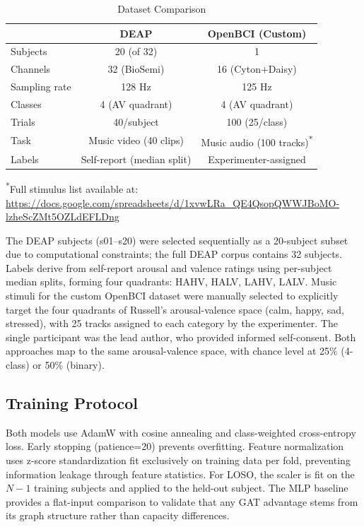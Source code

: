 \documentclass[a4paper, 10pt, conference]{ieeeconf}
\begin{document}
\begin{table}[t]
\centering
\caption{Dataset Comparison}
\label{tab:datasets}
\begin{tabular}{lcc}
\toprule
& DEAP & OpenBCI (Custom) \\
\midrule
Subjects & 20 (of 32) & 1 \\
Channels & 32 (BioSemi) & 16 (Cyton+Daisy) \\
Sampling rate & 128 Hz & 125 Hz \\
Classes & 4 (AV quadrant) & 4 (AV quadrant) \\
Trials & 40/subject & 100 (25/class) \\
Task & Music video (40 clips) & Music audio (100 tracks)\textsuperscript{*} \\
Labels & Self-report (median split) & Experimenter-assigned \\
\bottomrule
\end{tabular}
\vspace{1mm}
\scriptsize\textsuperscript{*}Full stimulus list available at: \url{https://docs.google.com/spreadsheets/d/1xvwLRa_QE4QsopQWWJBoMO-lzheScZMt5OZLdEFLDng}
\end{table}

The DEAP subjects (s01--s20) were selected sequentially as a 20-subject subset due to computational constraints; the full DEAP corpus contains 32 subjects. Labels derive from self-report arousal and valence ratings using per-subject median splits, forming four quadrants: HAHV, HALV, LAHV, LALV. Music stimuli for the custom OpenBCI dataset were manually selected to explicitly target the four quadrants of Russell's arousal-valence space (calm, happy, sad, stressed), with 25 tracks assigned to each category by the experimenter. The single participant was the lead author, who provided informed self-consent. Both approaches map to the same arousal-valence space, with chance level at 25\% (4-class) or 50\% (binary).

\subsection{Training Protocol}

Both models use AdamW with cosine annealing and class-weighted cross-entropy loss. Early stopping (patience=20) prevents overfitting. Feature normalization uses z-score standardization fit exclusively on training data per fold, preventing information leakage through feature statistics. For LOSO, the scaler is fit on the $N{-}1$ training subjects and applied to the held-out subject. The MLP baseline provides a flat-input comparison to validate that any GAT advantage stems from its graph structure rather than capacity differences.
\end{document}

